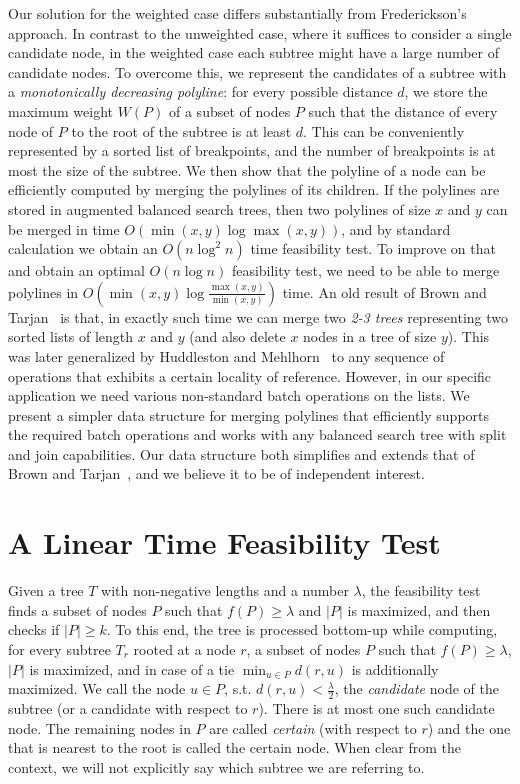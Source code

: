 \documentclass[11pt,a4paper]{article}
\newcommand{\Oh}{{O}}
\theoremstyle{definition}
\theoremstyle{remark}
\begin{document}
\vspace{0.04in} 
Our solution for the weighted case differs substantially from Frederickson's approach.
In contrast to the unweighted case, where it suffices to consider a single candidate node, in the weighted case each subtree might have a large number of candidate nodes. 
  To overcome this, we represent the candidates of a subtree with a {\em monotonically decreasing polyline}:
for every possible distance $d$, we store the maximum weight $W(P)$ of a subset of nodes $P$ such that the distance of every node of $P$ to the root of the subtree is at least $d$.
This can be conveniently represented by a sorted list of breakpoints, and the number of breakpoints is at most
the size of the subtree. We then show that the polyline of a node can be efficiently computed by merging the polylines of its children. If the polylines
are stored in augmented balanced search trees, then two polylines of size $x$ and $y$ can be merged in time $\Oh(\min(x,y)\log\max(x,y))$,
and by standard calculation we obtain an $\Oh(n\log^{2}n)$ time feasibility test. To improve on that and obtain an optimal $\Oh(n\log n)$ feasibility test,
we need to be able to merge polylines in $\Oh(\min(x,y)\log\frac{\max(x,y)}{\min(x,y)})$ time. 
An old result of Brown and Tarjan~\cite{Brown1980} is that, in exactly such time we can merge two {\em 2-3 trees} representing two sorted lists of length $x$ and $y$ (and also delete $x$ nodes in a tree of size $y$). This was later generalized by Huddleston and
Mehlhorn~\cite{huddlestonM82} to any sequence of operations that exhibits a certain locality of reference. However, in our specific
application we need various non-standard batch operations on the lists.
We present a simpler data structure for merging polylines that efficiently supports the required batch operations and works with  
any balanced search tree with split and join capabilities. Our data structure both simplifies and extends that of Brown and Tarjan~\cite{Brown1980}, and we believe it to be of independent interest. 


\section{A Linear Time Feasibility Test}
\label{linear F.T.}

Given a tree $T$ with non-negative lengths and a number $\lambda$, the feasibility test finds a subset of nodes $P$ such that $f(P)\geq\lambda$
and $|P|$ is maximized, and then checks if $|P|\geq k$.
To this end, the tree is processed bottom-up while computing, for every subtree $T_{r}$ rooted at a node $r$, a subset of nodes $P$ such that
$f(P)\geq\lambda$, $|P|$ is maximized, and in case of a tie $\min_{u\in P}d(r,u)$ is additionally maximized.
We call the node $u\in P$, s.t. $d(r,u)<\frac{\lambda}{2}$, the \emph{candidate} node of the subtree (or a candidate with respect to $r$). There is at most one such candidate node.
The remaining nodes in $P$ are called \emph{certain} (with respect to $r$) and the one that is nearest to the root is called the certain node.
When clear from the context, we will not explicitly say which subtree we are referring to.
\end{document}
